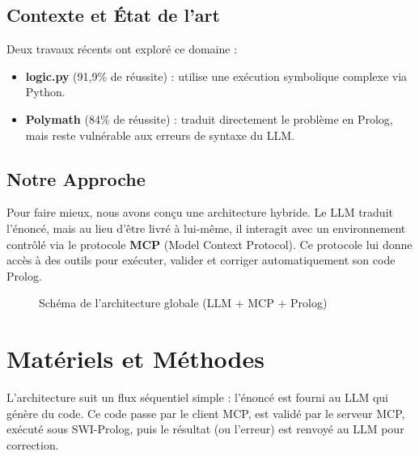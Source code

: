 \documentclass[12pt,a4paper]{article}
\begin{document}
\subsection{Contexte et État de l'art}
Deux travaux récents ont exploré ce domaine :
\begin{itemize}
    \item \textbf{logic.py} (91,9\% de réussite) : utilise une exécution symbolique complexe via Python.
    \item \textbf{Polymath} (84\% de réussite) : traduit directement le problème en Prolog, mais reste vulnérable aux erreurs de syntaxe du LLM.
\end{itemize}

\subsection{Notre Approche}
Pour faire mieux, nous avons conçu une architecture hybride. Le LLM traduit l'énoncé, mais au lieu d'être livré à lui-même, il interagit avec un environnement contrôlé via le protocole \textbf{MCP} (Model Context Protocol). Ce protocole lui donne accès à des outils pour exécuter, valider et corriger automatiquement son code Prolog.

\begin{figure}[H]
    \centering
    \vspace{4cm} %
    \caption{Schéma de l'architecture globale (LLM + MCP + Prolog)}
    \label{fig:architecture}
\end{figure}

\section{Matériels et Méthodes}

L'architecture suit un flux séquentiel simple : l'énoncé est fourni au LLM qui génère du code. Ce code passe par le client MCP, est validé par le serveur MCP, exécuté sous SWI-Prolog, puis le résultat (ou l'erreur) est renvoyé au LLM pour correction.
\end{document}
